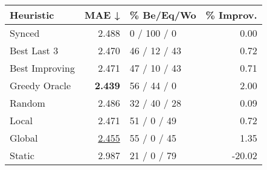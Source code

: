 \begin{tabular}{lrlr}
\toprule
\textbf{Heuristic} & \textbf{MAE ↓} & \textbf{\% Be/Eq/Wo} & \textbf{\% Improv.} \\
\midrule
            Synced &          2.488 &          0 / 100 / 0 &                0.00 \\
\midrule
       Best Last 3 &          2.470 &         46 / 12 / 43 &                0.72 \\
    Best Improving &          2.471 &         47 / 10 / 43 &                0.71 \\
\addlinespace
     Greedy Oracle &          \textbf{2.439} &          56 / 44 / 0 &                2.00 \\
            Random &          2.486 &         32 / 40 / 28 &                0.09 \\
\midrule
             Local &          2.471 &          51 / 0 / 49 &                0.72 \\
            Global &          \underline{2.455} &          55 / 0 / 45 &                1.35 \\
\midrule
            Static &          2.987 &          21 / 0 / 79 &              -20.02 \\
\bottomrule
\end{tabular}

\label{tab:hr_non_lr01_le1_bs2_Summary}
